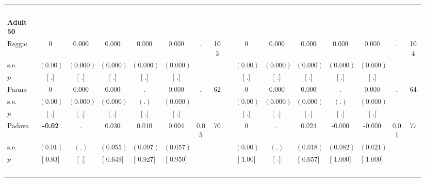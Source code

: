 \begin{longtable}{L{8em} c c c c c c c p{1em} c c c c c c c}
~\\[1em]
\quad \quad \textbf{Adult 50} & & & & & & & & & & & & & & & \\* 
\quad \quad \quad Reggio& 0 &     0.000 &     0.000 &     0.000 &     0.000 &         . &       103 & & 0 &     0.000 &     0.000 &     0.000 &     0.000 &         . &       104  \\*
\quad \quad \quad \quad s.e.& $ (     0.00)$ & $ (    0.000)$ & $ (    0.000)$ & $ (    0.000)$ & $ (    0.000)$ & & & & $ (     0.00)$ & $ (    0.000)$ & $ (    0.000)$ & $ (    0.000)$ & $ (    0.000)$ & &  \\*
\quad \quad \quad \quad $ p$ & [        .] & [        .] & [        .] & [        .] & [        .] & & & & [        .] & [        .] & [        .] & [        .] & [        .] & &  \\[1em]
\quad \quad \quad Parma& 0 &     0.000 &     0.000 &         . &     0.000 &         . &        62 & & 0 &     0.000 &     0.000 &         . &     0.000 &         . &        64  \\*
\quad \quad \quad \quad s.e.& $ (     0.00)$ & $ (    0.000)$ & $ (    0.000)$ & $ (        .)$ & $ (    0.000)$ & & & & $ (     0.00)$ & $ (    0.000)$ & $ (    0.000)$ & $ (        .)$ & $ (    0.000)$ & &  \\*
\quad \quad \quad \quad $ p$ & [        .] & [        .] & [        .] & [        .] & [        .] & & & & [        .] & [        .] & [        .] & [        .] & [        .] & &  \\[1em]
\quad \quad \quad Padova& \textbf{    -0.02} &         . &     0.030 &     0.010 &     0.004 &      0.05 &        70 & & 0 &         . &     0.024 &    -0.000 &    -0.000 &      0.01 &        77  \\*
\quad \quad \quad \quad s.e.& $ (     0.01)$ & $ (        .)$ & $ (    0.055)$ & $ (    0.097)$ & $ (    0.057)$ & & & & $ (     0.00)$ & $ (        .)$ & $ (    0.018)$ & $ (    0.082)$ & $ (    0.021)$ & &  \\*
\quad \quad \quad \quad $ p$ & [     0.83] & [        .] & [    0.649] & [    0.927] & [    0.950] & & & & [     1.00] & [        .] & [    0.657] & [    1.000] & [    1.000] & &  \\[1em]
~\\[1em]
\end{longtable}